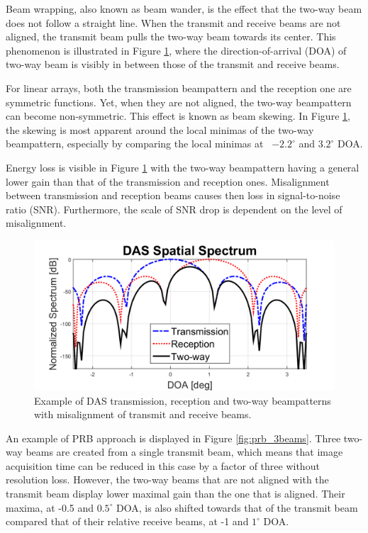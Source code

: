 Beam wrapping, also known as beam wander, is the effect that the two-way beam does not follow a straight line. When the transmit and receive beams are not aligned, the transmit beam pulls the two-way beam towards its center.
This phenomenon is illustrated in Figure \ref{fig:prb}, where the direction-of-arrival (DOA) of two-way beam is visibly in between those of the transmit and receive beams.

For linear arrays, both the transmission beampattern and the reception one are symmetric functions. Yet, when they are not aligned, the two-way beampattern can become non-symmetric. This effect is known as beam skewing. In Figure \ref{fig:prb}, the skewing is most apparent around the local minimas of the two-way beampattern, especially by comparing the local minimas at ~$-2.2^\circ$ and $3.2^\circ$ DOA.

Energy loss is visible in Figure \ref{fig:prb} with the two-way beampattern having a general lower gain than that of the transmission and reception ones.
Misalignment between transmission and reception beams causes then loss in signal-to-noise ratio (SNR). Furthermore, the scale of SNR drop is dependent on the level of misalignment.

\begin{figure}[ht]
    \centering
    \includegraphics[width=\linewidth]{./images/background/prb.png}
	\caption{Example of DAS transmission, reception and two-way beampatterns with misalignment of transmit and receive beams.}
	\label{fig:prb}
\end{figure}

An example of PRB approach is displayed in Figure \ref{fig:prb_3beams}. Three two-way beams are created from a single transmit beam, which means that image acquisition time can be reduced in this case by a factor of three without resolution loss. However, the two-way beams that are not aligned with the transmit beam display lower maximal gain than the one that is aligned.
Their maxima, at -0.5 and $0.5^\circ$ DOA, is also shifted towards that of the transmit beam compared that of their relative receive beams, at -1 and $1^\circ$ DOA.

